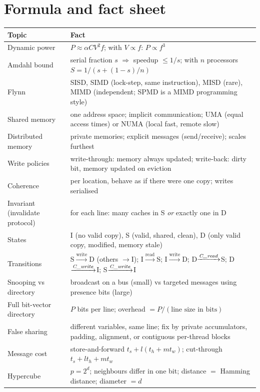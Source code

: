\section{Formula and fact sheet}

\begin{center}
\small
\begin{tabularx}{\linewidth}{@{}l X@{}}
\toprule
\textbf{Topic} & \textbf{Fact}\\
\midrule
Dynamic power & $P\approx\alpha CV^{2}f$; with $V\propto f$: $P\propto f^{3}$\\
Amdahl bound & serial fraction $s$ $\Rightarrow$ speedup $\le 1/s$; with $n$ processors $S=1/(s+(1-s)/n)$\\
Flynn & SISD, SIMD (lock-step, same instruction), MISD (rare), MIMD (independent; SPMD is a MIMD programming style)\\
Shared memory & one address space; implicit communication; UMA (equal access times) or NUMA (local fast, remote slow)\\
Distributed memory & private memories; explicit messages (send/receive); scales furthest\\
Write policies & write-through: memory always updated; write-back: dirty bit, memory updated on eviction\\
Coherence & per location, behave as if there were one copy; writes serialised\\
Invariant (invalidate protocol) & for each line: many caches in S \emph{or} exactly one in D\\
States & I (no valid copy), S (valid, shared, clean), D (only valid copy, modified, memory stale)\\
Transitions & S$\xrightarrow{\text{write}}$D (others $\to$I); I$\xrightarrow{\text{read}}$S; I$\xrightarrow{\text{write}}$D; D$\xrightarrow{\textit{C\_read}}$S; D$\xrightarrow{\textit{C\_write}}$I; S$\xrightarrow{\textit{C\_write}}$I\\
Snooping vs directory & broadcast on a bus (small) vs targeted messages using presence bits (large)\\
Full bit-vector directory & $P$ bits per line; overhead $=P/(\text{line size in bits})$\\
False sharing & different variables, same line; fix by private accumulators, padding, alignment, or contiguous per-thread blocks\\
Message cost & store-and-forward $t_s+l(t_h+mt_w)$; cut-through $t_s+lt_h+mt_w$\\
Hypercube & $p=2^{d}$; neighbours differ in one bit; distance $=$ Hamming distance; diameter $=d$\\

\end{tabularx}
\end{center}
